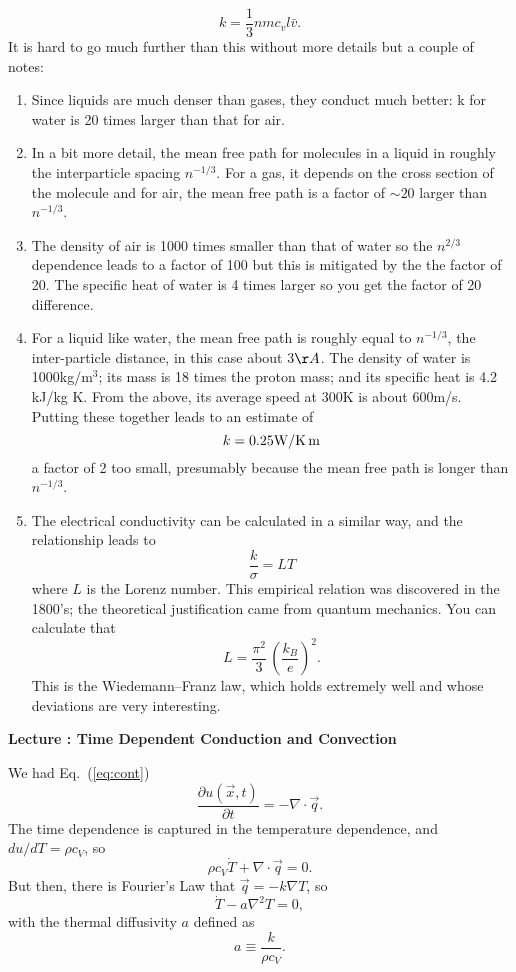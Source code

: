 \documentclass[11pt]{book}
\def\be{\begin{equation}}
\def\ee{\end{equation}}
\newcommand{\ec}[1]{Eq.~(\ref{eq:#1})}
\newcommand\bee{\begin{enumerate}}
\newcommand\eee{\end{enumerate}}
\newcommand\lecture[1]{\newpage
\addtocounter{lectureno}{1}
\setcounter{secno}{0}
\begin{center}
 {\bf Lecture \arabic{lectureno}: #1}
\end{center}
}
\newcounter{lectureno}
\newcounter{secno}
\begin{document}
\be
k = \frac13 nm c_v l\bar v.\ee
It is hard to go much further than this without more details but a couple of notes:
\bee
\item Since liquids are much denser than gases, they conduct much better: k for water is 20 times larger than that for air.
\item In a bit more detail, the mean free path for molecules in a liquid in roughly the interparticle spacing $n^{-1/3}$. For a gas, it depends on the cross section of the molecule and for air, the mean free path is a factor of $\sim 20$ larger than $n^{-1/3}$.
\item The density of air is 1000 times smaller than that of water so the $n^{2/3}$ dependence leads to a factor of 100 but this is mitigated by the the factor of 20. The specific heat of water is 4 times larger so you get the factor of 20 difference.
\item For a liquid like water, the mean free path is roughly equal to $n^{-1/3}$, the inter-particle distance, in this case about 3$\AA$. The density of water is 1000kg/m$^3$; its mass is 18 times the proton mass; and its specific heat is 4.2 kJ/kg K. From the above, its average speed at 300K is about 600m/s. Putting these together leads to an estimate of
\be
k=0.25 {\rm W/K\,m}\ee
a factor of 2 too small, presumably because the mean free path is longer than $n^{-1/3}$.
\item The electrical conductivity can be calculated in a similar way, and the relationship leads to
\be
\frac{k}{\sigma} = LT\ee
where $L$ is the Lorenz number. This empirical relation was discovered in the 1800's; the theoretical justification came from quantum mechanics. You can calculate that
\be
L= \frac{\pi^2}{3}\,\left(\frac{k_B}e\right)^2.\ee
This is the Wiedemann–Franz law, which holds extremely well and whose deviations are very interesting.
\eee

\lecture{Time Dependent Conduction and Convection}

We had \ec{cont}
\be
\frac{\partial u(\vec x, t)}{\partial t} = -\nabla\cdot \vec q.\ee
The time dependence is captured in the temperature dependence, and $du/dT = \rho c_V$, so
\be
\rho c_V \dot T + \nabla\cdot \vec q = 0.\ee
But then, there is Fourier's Law that $\vec q = -k \nabla T$, so
\be
\dot T - a\nabla^2 T=0,\ee
with the thermal diffusivity $a$ defined as
\be
a \equiv \frac{k}{\rho c_V} .\ee

\end{document}
